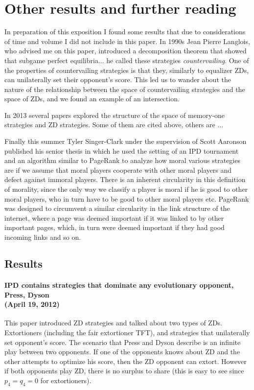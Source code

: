 \chapter{Other results and further reading}
In preparation of this exposition I found some results that due to considerations of time and volume I did not include in this paper. In 1990s Jean Pierre Langlois, who advised me on this paper, introduced a decomposition theorem that showed that subgame perfect equilibria... he called these strategies \textit{countervailing}. One of the properties of countervailing strategies is that they, similarly to equalizer ZDs, can unilaterally set their opponent's score. This led us to wander about the nature of the relationship between the space of countervailing strategies and the space of ZDs, and we found an example of an intersection.

In 2013 several papers explored the structure of the space of memory-one strategies and ZD strategies. Some of them are cited above, others are ...

Finally this summer Tyler Singer-Clark under the supervision of Scott Aaronson published his senior thesis in which he used the setting of an IPD tournament and an algorithm similar to PageRank to analyze how moral various strategies are if we assume that moral players cooperate with other moral players and defect against immoral players. There is an inherent circularity in this definition of morality, since the only way we classify a player is moral if he is good to other moral players, who in turn have to be good to other moral players etc. PageRank was designed to circumvent a similar circularity in the link structure of the internet, where a page was deemed important if it was linked to by other important pages, which, in turn were deemed important if they had good incoming links and so on.





\section{Results}

\subsubsection{IPD contains strategies that dominate any evolutionary opponent, Press, Dyson \cite{Press26062012}
\\(April 19, 2012)}
This paper introduced ZD strategies and talked about two types of ZDs. Extortioners (including the fair extortioner TFT), and strategies that unilaterally set opponent's score. The scenario that Press and Dyson describe is an infinite play between two opponents. If one of the opponents knows about ZD and the other attempts to optimize his score, then the ZD opponent can extort. However if both opponents play ZD, there is no surplus to share (this is easy to see since $p_4 = q_4 = 0$ for extortioners). 


